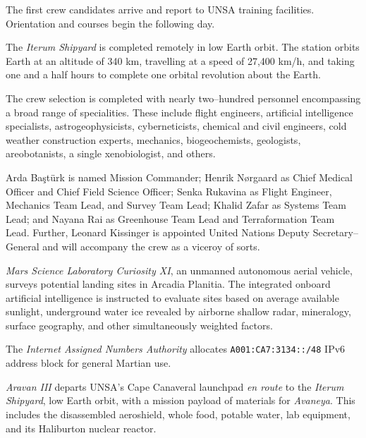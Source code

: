 The first crew candidates arrive and report to UNSA training facilities. Orientation and courses begin the following day.
\StopTimelineDate

The {\it Iterum Shipyard} is completed remotely in low Earth orbit. The station orbits Earth at an altitude of 340 km, travelling at a speed of 27,400 km/h, and taking one and a half hours to complete one orbital revolution about the Earth.
\StopTimelineDate

The crew selection is completed with nearly two--hundred personnel encompassing a broad range of specialities. These include flight engineers, artificial intelligence specialists, astrogeophysicists, cyberneticists, chemical and civil engineers, cold weather construction experts, mechanics, biogeochemists, geologists, areobotanists, a single xenobiologist, and others.

Arda Baştürk is named Mission Commander; Henrik Nørgaard as Chief Medical Officer and Chief Field Science Officer; Senka Rukavina as Flight Engineer, Mechanics Team Lead, and Survey Team Lead; Khalid Zafar as Systems Team Lead; and Nayana Rai as Greenhouse Team Lead and Terraformation Team Lead. Further, Leonard Kissinger is appointed United Nations Deputy Secretary--General and will accompany the crew as a viceroy of sorts.
\StopTimelineDate

{\it Mars Science Laboratory Curiosity XI}, an unmanned autonomous aerial vehicle, surveys potential landing sites in Arcadia Planitia. The integrated onboard artificial intelligence is instructed to evaluate sites based on average available sunlight, underground water ice revealed by airborne shallow radar, mineralogy, surface geography, and other simultaneously weighted factors.
\StopTimelineDate

The {\it Internet Assigned Numbers Authority} allocates {\tt A001:CA7:3134::/48} IPv6 address block for general Martian use. 
\StopTimelineDate

{\it Aravan III} departs UNSA's Cape Canaveral launchpad {\it en route} to the {\it Iterum Shipyard}, low Earth orbit, with a mission payload of materials for {\it Avaneya}. This includes the disassembled aeroshield, whole food, potable water, lab equipment, and its Haliburton nuclear reactor.
\StopTimelineDate

